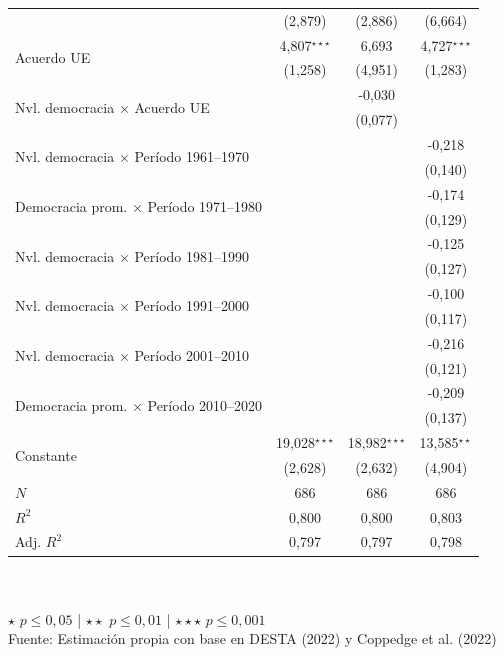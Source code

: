 \documentclass[a4paper]{tufte-handout}
\begin{document}
\begin{table}[h]
\begin{tabular}{l c c c}
    & {\scriptsize (2,879)} & {\scriptsize (2,886)} & {\scriptsize (6,664)}\\
    \multirow{2}{*}{Acuerdo UE} & 4,807$^{\star\star\star}$ & 6,693 & 4,727$^{\star\star\star}$ \\
    & {\scriptsize (1,258)} & {\scriptsize (4,951)} & {\scriptsize (1,283)}\\
    \multirow{2}{*}{Nvl. democracia $\times$ Acuerdo UE} & & -0,030 & \\
    & & {\scriptsize (0,077)} & \\
    \multirow{2}{*}{Nvl. democracia $\times$ Período 1961--1970} & & & -0,218 \\
    & & & {\scriptsize (0,140)}\\
    \multirow{2}{*}{Democracia prom. $\times$ Período 1971--1980} & & & -0,174 \\
    & & & {\scriptsize (0,129)}\\
    \multirow{2}{*}{Nvl. democracia $\times$ Período 1981--1990} & & & -0,125 \\
    & & & {\scriptsize (0,127)}\\
    \multirow{2}{*}{Nvl. democracia $\times$ Período 1991--2000} & & & -0,100 \\
    & & & {\scriptsize (0,117)}\\
    \multirow{2}{*}{Nvl. democracia $\times$ Período 2001--2010} & & & -0,216 \\
    & & & {\scriptsize (0,121)}\\
    \multirow{2}{*}{Democracia prom. $\times$ Período 2010--2020} & & & -0,209 \\
    & & & {\scriptsize (0,137)}\\
    \multirow{2}{*}{Constante} & 19,028$^{\star\star\star}$ & 18,982$^{\star\star\star}$ & 13,585$^{\star\star}$  \\
    & {\scriptsize (2,628)} & {\scriptsize (2,632)} & {\scriptsize (4,904)} \\ \midrule
    $N$ & 686 & 686 & 686 \\ \midrule
    $R^2$ & 0,800 & 0,800 & 0,803 \\
    Adj. $R^2$ & 0,797 & 0,797 & 0,798 \\ \bottomrule
  \end{tabular}
  \\~\\ \smallskip\noindent\scriptsize $\star$ $p \leq 0,05$ | $\star\star$ $p \leq 0,01$ | $\star\star\star$ $p \leq 0,001$  \\ Fuente: Estimación propia con base en DESTA (2022) y Coppedge et al. (2022)
\end{table}

\end{document}
